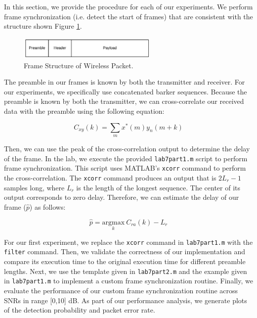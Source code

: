 \documentclass{article}
\begin{document}
In this section, we provide the procedure for each of our experiments. We perform frame synchronization (i.e. detect the start of frames) that are consistent with the structure shown Figure \ref{fig::frame_structure}.

\begin{figure}[H]
	\centerline{\includegraphics[width=0.6\textwidth]{frame_structure.png}}
	\caption{Frame Structure of Wireless Packet.}
	\label{fig::frame_structure}
\end{figure}

\noindent The preamble in our frames is known by both the transmitter and receiver. For our experiments, we specifically use concatenated barker sequences. Because the preamble is known by both the transmitter, we can cross-correlate our received data with the preamble using the following equation:

\begin{equation}
	C_{xy}(k) = \sum_{m}{x^*(m)y_n(m+k)}
\end{equation}

\noindent Then, we can use the peak of the cross-correlation output to determine the delay of the frame. In the lab, we execute the provided \texttt{lab7part1.m} script to perform frame synchronization. This script uses MATLAB's \texttt{xcorr} command to perform the cross-correlation. The \texttt{xcorr} command produces an output that is $2L_r - 1$ samples long, where $L_r$ is the length of the longest sequence. The center of its output corresponds to zero delay. Therefore, we can estimate the delay of our frame ($\hat{p}$) as follows:

\begin{equation}
	\hat{p} = \underset{k}{\text{argmax}}\ C_{ra}(k) - L_r
\end{equation}

\noindent For our first experiment, we replace the \texttt{xcorr} command in \texttt{lab7part1.m} with the \texttt{filter} command. Then, we validate the correctness of our implementation and compare its execution time to the original execution time for different preamble lengths. Next, we use the template given in \texttt{lab7part2.m} and the example given in \texttt{lab7part1.m} to implement a custom frame synchronization routine. Finally, we evaluate the performance of our custom frame synchronization routine across SNRs in range [0,10] dB. As part of our performance analysis, we generate plots of the detection probability and packet error rate.
 
\end{document}
